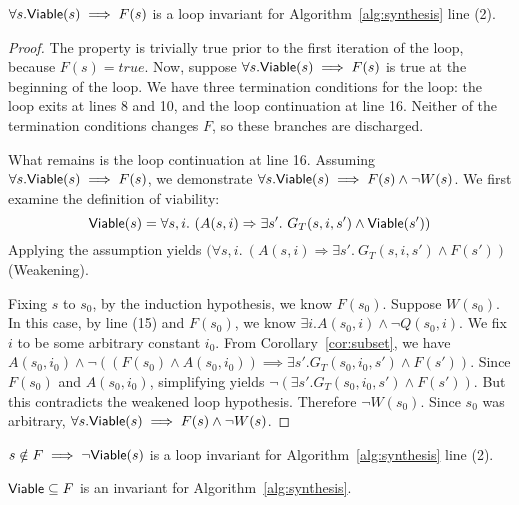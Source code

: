 \begin{lemma}
$\forall s. {\mathsf {Viable}}(s) \implies F(s)$ is a loop invariant for Algorithm~\ref{alg:synthesis} line (2).
\label{lem:alg1-viable}
\end{lemma}

\begin{proof}
The property is trivially true prior to the first iteration of the loop, because
$F(s) = true$.  Now, suppose $\forall s . {\mathsf {Viable}}(s) \implies F(s)$ is true at the beginning of the loop.  We have three termination conditions for the loop: the loop exits at lines 8 and 10, and the loop continuation at line 16.  Neither of the termination conditions changes $F$, so these branches are discharged.

What remains is the loop continuation at line 16.  Assuming $\forall s . {\mathsf {Viable}}(s) \implies F(s)$, we demonstrate $\forall s . {\mathsf {Viable}}(s) \implies F(s) \land \lnot W(s)$.  We first examine the definition of viability:
\[
    \viable(s) = \forall s,i. \ (A(s, i) \Rightarrow \exists s'.~ G_T(s, i,s') \land \viable(s'))
\]
Applying the assumption yields $(\forall s,i. \ (A(s, i) \Rightarrow \exists s'.~ G_T(s, i,s') \land F(s'))$ (Weakening).

Fixing $s$ to $s_0$, by the induction hypothesis, we know $F(s_0)$.  Suppose $W(s_0)$.  In this case, by line (15) and $F(s_0)$, we know $\exists i. A(s_0, i) \land \lnot Q(s_0, i)$.  We fix $i$ to be some arbitrary constant $i_0$.  From Corollary~\ref{cor:subset}, we have
$A(s_0, i_0) \land \lnot ((F(s_0) \land A(s_0,i_0)) \implies \exists s'.G_{T}(s_0,i_0,s') \land F(s'))$.  Since $F(s_0)$ and $A(s_0, i_0)$, simplifying
yields $\lnot (\exists s'.G_{T}(s_0,i_0,s') \land F(s'))$.  But this contradicts the weakened loop hypothesis.  Therefore $\lnot W(s_0)$.  Since $s_0$ was arbitrary, $\forall s . {\mathsf {Viable}}(s) \implies F(s) \land \lnot W(s)$.
\end{proof}

\begin{corollary}
$s \notin F \implies \lnot {\mathsf {Viable}}(s)$ is a loop invariant for Algorithm~\ref{alg:synthesis} line (2).
\label{cor:alg1-nonviable}
\end{corollary}
\fi

\begin{lemma}
  ${\mathsf {Viable}} \subseteq F$ is an invariant for
  Algorithm~\ref{alg:synthesis}.
\label{lem:alg1-viable}
\end{lemma}

